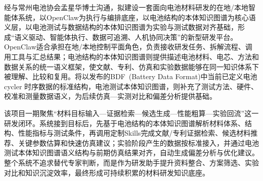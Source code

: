 \maketitle
经与常州电池协会孟星华博士沟通，拟建设一套面向电池材料研发的在地/本地智能体系统，以\textrm{OpenClaw}为执行与编排底座，以电池结构的本体知识图谱为核心语义层，以电池测试与数据结构的本体知识图谱为实验与测试数据对齐基础，形成``语义驱动、智能体执行、数据可追溯、人机协同决策''的新型研发平台。\textrm{OpenClaw}适合承担在地/本地控制平面角色，负责接收研发任务、拆解流程、调用工具与汇总结果；电池结构的本体知识图谱则提供描述电池材料、电芯、方法和数据关系的统一语义框架，使文献、专利、仿真和实验数据能够在同一知识体系下被理解、比较和复用。将以发布的\textrm{BDF~(Battery Data Format)}中当前已定义电池 cycler 时序数据的标准结构，电池测试本体知识图谱，则补充了测试方法、硬件、校准和测量数据语义，为后续仿真—实测对比和偏差分析提供基础。

该项目一期聚焦``材料目标输入—证据检索—候选生成—性能粗算—实验回流''这一研发闭环。系统接到目标后，先基于电池结构的本体知识图谱解析材料体系、结构、性能指标与测试条件，再调用定制\textrm{Skills}完成文献/专利证据检索、候选材料推荐、关键参数估算和快速仿真建议；实验阶段产生的数据按标准接入，并通过电池测试本体知识图谱语义结构与前期仿真结果对齐，自动生成偏差分析与优化建议。整个系统不追求替代专家判断，而是作为研发助手提升资料整合、方案筛选、实验对比和知识沉淀效率，最终形成可持续积累的材料研发知识底座。
